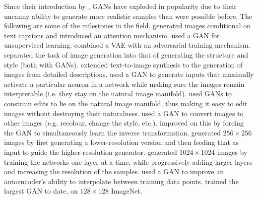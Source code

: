 \documentclass[11pt, a4paper, openany]{book}
\begin{document}
Since their introduction by \citet{gan}, GANs have exploded in popularity due to their uncanny ability to generate more realistic samples than were possible before. The following are some of the milestones in the field. \citet{imagefromcaption} generated images conditional on text captions and introduced an attention mechanism. \citet{unsupervisedgan} used a GAN for unsupervised learning. \citet{vaegan} combined a VAE with an adversarial training mechanism. \citet{structurestylegan} separated the task of image generation into that of generating the structure and style (both with GANs). \citet{texttoimagegan} extended text-to-image synthesis to the generation of images from detailed descriptions. \citet{preferredinputs} used a GAN to generate inputs that maximally activate a particular neuron in a network while making sure the images remain interpretable (i.e. they stay on the natural image manifold). \citet{manifoldmanipulation} used GANs to constrain edits to lie on the natural image manifold, thus making it easy to edit images without destroying their naturalness. \citet{imagetoimagegan} used a GAN to convert images to other images (e.g. recolour, change the style, etc.). \citet{cyclegan} improved on this by forcing the GAN to simultaneously learn the inverse transformation. \citet{stackgan} generated $256\times 256$ images by first generating a lower-resolution version and then feeding that as input to guide the higher-resolution generator. \citet{progressivegrowing} generated $1024\times 1024$ images by training the networks one layer at a time, while progressively adding larger layers and increasing the resolution of the samples. \citet{vaeganinterpolation} used a GAN to improve an autoencoder's ability to interpolate between training data points. \citet{largegan} trained the largest GAN to date, on $128\times 128$ ImageNet.
\end{document}
